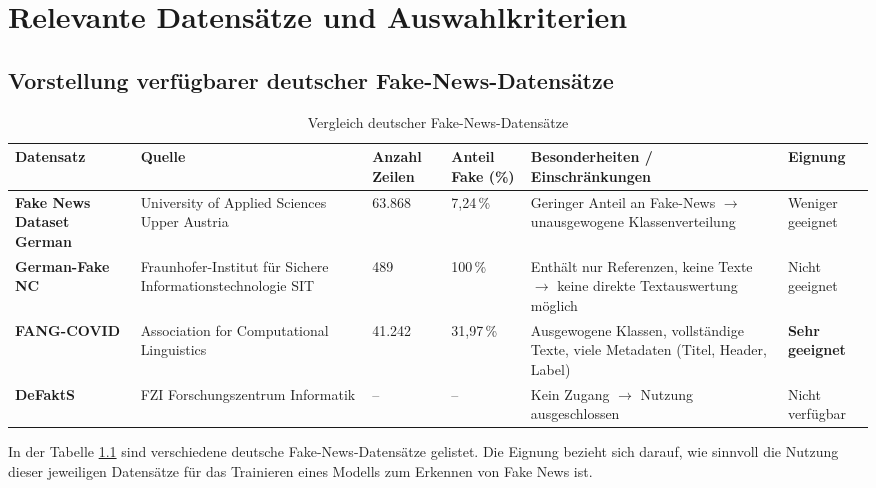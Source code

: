 \chapter{Relevante Datensätze und Auswahlkriterien}
\label{chap:relevante_datensaetze_und_auswahlkriterien}

\section{Vorstellung verfügbarer deutscher Fake-News-Datensätze}
\label{sec:vorstellung_verfuegbare_deutsche_fake_news_datensaetze}

\begin{table}[ht]
    \centering
    \renewcommand{\arraystretch}{1.3}
    \begin{tabular}{|p{1.9cm}|p{2.3cm}|p{1.3cm}|p{1.3cm}|p{3.3cm}|p{1.5cm}|}
        \hline
        \textbf{Datensatz} & \textbf{Quelle} & \textbf{Anzahl Zeilen} & \textbf{Anteil Fake (\%)} & \textbf{Besonderheiten / Einschränkungen} & \textbf{Eignung} \\
        \hline
        \textbf{Fake News Dataset German} & University of Applied Sciences Upper Austria & 63.868 & 7{,}24\,\% & Geringer Anteil an Fake-News $\rightarrow$ unausgewogene Klassenverteilung & Weniger geeignet \\
        \hline
        \textbf{German-Fake NC} & Fraunhofer-Institut für Sichere Informationstechnologie SIT & 489 & 100\,\% & Enthält nur Referenzen, keine Texte $\rightarrow$ keine direkte Textauswertung möglich & Nicht geeignet \\
        \hline
        \textbf{FANG-COVID} & Association for Computational Linguistics & 41.242 & 31{,}97\,\% & Ausgewogene Klassen, vollständige Texte, viele Metadaten (Titel, Header, Label) & \textbf{Sehr geeignet} \\
        \hline
        \textbf{DeFaktS} & FZI Forschungszentrum Informatik & -- & -- & Kein Zugang $\rightarrow$ Nutzung ausgeschlossen & Nicht verfügbar \\
        \hline
    \end{tabular}
    \caption{Vergleich deutscher Fake-News-Datensätze}
    \label{tab:deutsche-fake-news-datensaetze}
\end{table}

In der Tabelle \ref{tab:deutsche-fake-news-datensaetze} sind verschiedene deutsche Fake-News-Datensätze gelistet.
Die Eignung bezieht sich darauf, wie sinnvoll die Nutzung dieser jeweiligen Datensätze für das Trainieren eines Modells zum Erkennen von Fake News ist.

